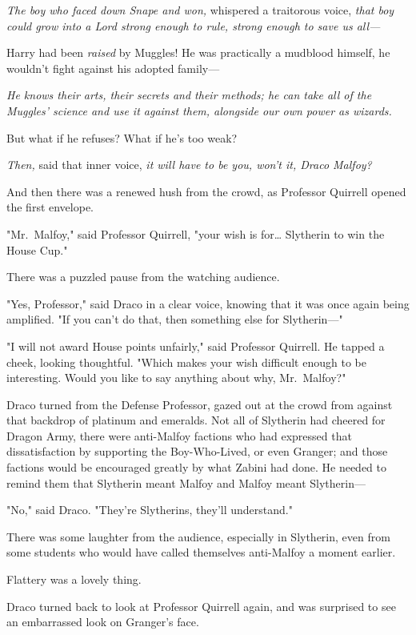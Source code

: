 \emph{The boy who faced down Snape and won,} whispered a traitorous voice,
\emph{that boy could grow into a Lord strong enough to rule, strong enough to
save us all---}

Harry had been \emph{raised} by Muggles! He was practically a mudblood himself,
he wouldn't fight against his adopted family---

\emph{He knows their arts, their secrets and their methods; he can take all of
the Muggles' science and use it against them, alongside our own power as
wizards.}

But what if he refuses? What if he's too weak?

\emph{Then,} said that inner voice, \emph{it will have to be you, won't it,
Draco Malfoy?}

And then there was a renewed hush from the crowd, as Professor Quirrell opened
the first envelope.

"Mr.~Malfoy," said Professor Quirrell, "your wish is for{\ldots} Slytherin to
win the House Cup."

There was a puzzled pause from the watching audience.

"Yes, Professor," said Draco in a clear voice, knowing that it was once again
being amplified. "If you can't do that, then something else for Slytherin---"

"I will not award House points unfairly," said Professor Quirrell. He tapped a
cheek, looking thoughtful. "Which makes your wish difficult enough to be
interesting. Would you like to say anything about why, Mr.~Malfoy?"

Draco turned from the Defense Professor, gazed out at the crowd from against
that backdrop of platinum and emeralds. Not all of Slytherin had cheered for
Dragon Army, there were anti-Malfoy factions who had expressed that
dissatisfaction by supporting the Boy-Who-Lived, or even Granger; and those
factions would be encouraged greatly by what Zabini had done. He needed to
remind them that Slytherin meant Malfoy and Malfoy meant Slytherin---

"No," said Draco. "They're Slytherins, they'll understand."

There was some laughter from the audience, especially in Slytherin, even from
some students who would have called themselves anti-Malfoy a moment earlier.

Flattery was a lovely thing.

Draco turned back to look at Professor Quirrell again, and was surprised to see
an embarrassed look on Granger's face.

